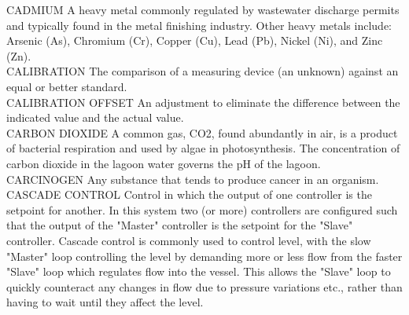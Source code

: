 \documentclass{article}
\begin{document}
CADMIUM
A heavy metal commonly regulated by wastewater discharge permits and typically found in the metal finishing industry.  Other heavy metals include: Arsenic (As), Chromium (Cr), Copper (Cu), Lead (Pb), Nickel (Ni), and Zinc (Zn).
\vspace{0.3cm}\\


CALIBRATION
The comparison of a measuring device (an unknown) against an equal or better standard.
\vspace{0.3cm}\\
CALIBRATION OFFSET
An adjustment to eliminate the difference between the indicated value and the actual value.
\vspace{0.3cm}\\











CARBON DIOXIDE
A common gas, CO2, found abundantly in air, is a product of bacterial respiration and used by algae in photosynthesis. The concentration of carbon dioxide in the lagoon water governs the pH of the lagoon.
\vspace{0.3cm}\\


CARCINOGEN
Any substance that tends to produce cancer in an organism.
\vspace{0.3cm}\\

CASCADE CONTROL
Control in which the output of one controller is the setpoint for another.  In this system two (or more) controllers are configured such that the output of the "Master" controller is the setpoint for the "Slave" controller. Cascade control is commonly used to control level, with the slow "Master" loop controlling the level by demanding more or less flow from the faster "Slave" loop which regulates flow into the vessel. This allows the "Slave" loop to quickly counteract any changes in flow due to pressure variations etc., rather than having to wait until they affect the level.
\vspace{0.3cm}\\
\end{document}
